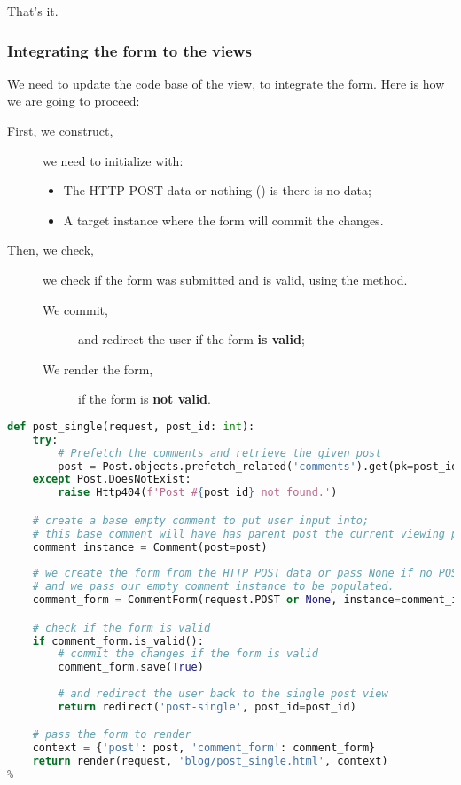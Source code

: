         That's it.
        
    \subsubsection{Integrating the form to the views}
        We need to update the code base of the  view,
        to integrate the  form. Here is how we are going to proceed:
        \begin{description}
            \item[First, we construct,] we need to initialize  with:
                \begin{itemize}
                    \item The HTTP POST data or nothing () is there is no data;
                    \item A target  instance where the form will commit the changes.
                \end{itemize}
            \item[Then, we check,] we check if the form was submitted and is valid, using the 
                 method.
                \begin{description}
                    \item[We commit,] and redirect the user if the form \textbf{is valid};
                    \item[We render the form,] if the form is \textbf{not valid}.
                \end{description}
        \end{description}
        
        \begin{lstlisting}[language=python, title=blog/views.py, numbers=none]
def post_single(request, post_id: int):
    try:
        # Prefetch the comments and retrieve the given post
        post = Post.objects.prefetch_related('comments').get(pk=post_id)
    except Post.DoesNotExist:
        raise Http404(f'Post #{post_id} not found.')

    # create a base empty comment to put user input into;
    # this base comment will have has parent post the current viewing post.
    comment_instance = Comment(post=post)
    
    # we create the form from the HTTP POST data or pass None if no POST data;
    # and we pass our empty comment instance to be populated.
    comment_form = CommentForm(request.POST or None, instance=comment_instance)

    # check if the form is valid
    if comment_form.is_valid():
        # commit the changes if the form is valid
        comment_form.save(True)
        
        # and redirect the user back to the single post view
        return redirect('post-single', post_id=post_id)

    # pass the form to render
    context = {'post': post, 'comment_form': comment_form}
    return render(request, 'blog/post_single.html', context)
%
        \end{lstlisting}
        
